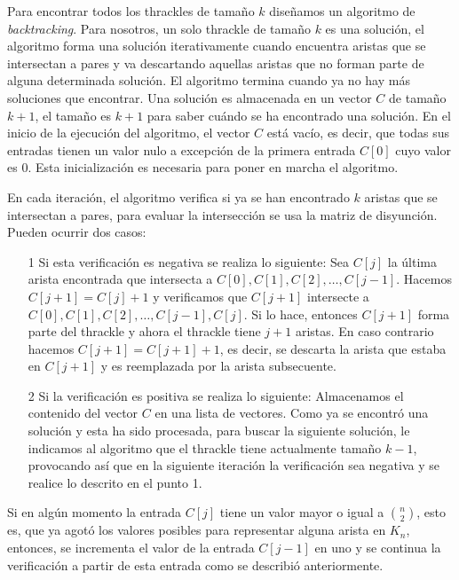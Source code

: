   Para encontrar todos los thrackles de tamaño $k$ diseñamos un algoritmo de
  \emph{backtracking}. Para nosotros, un solo thrackle de tamaño $k$ es una solución, el algoritmo forma una solución iterativamente cuando encuentra aristas que se intersectan a pares y va descartando aquellas aristas que no forman parte de alguna determinada solución. El algoritmo termina cuando ya no hay más soluciones que encontrar. Una solución es almacenada en un vector $C$ de tamaño $k+1$, el tamaño es $k+1$ para saber cuándo se ha encontrado una solución. En el inicio de la ejecución del algoritmo, el vector $C$ está vacío, es decir, que todas sus entradas tienen un valor nulo a excepción de la primera entrada $C[0]$ cuyo valor es 0. Esta inicialización es necesaria para poner en marcha el algoritmo.

  En cada iteración, el algoritmo verifica si ya se han encontrado $k$ aristas que se intersectan a pares, para evaluar la intersección se usa la matriz de disyunción. Pueden ocurrir dos casos:
  \begin{itemize}
    \item[1] Si esta verificación es negativa se realiza lo siguiente:
    Sea $C[j]$ la última arista encontrada que intersecta a $C[0],C[1],C[2],\dots,C[j-1]$. Hacemos $C[j+1]=C[j]+1$ y verificamos que $C[j+1]$ intersecte a $C[0],C[1],C[2],\dots,C[j-1],C[j]$.
    Si lo hace, entonces $C[j+1]$ forma parte del thrackle y ahora el thrackle tiene $j+1$ aristas. En caso contrario hacemos $C[j+1]=C[j+1]+1$, es decir, se descarta la arista que estaba en $C[j+1]$ y es reemplazada por la arista subsecuente.
    \item[2] Si la verificación es positiva se realiza lo siguiente:
    Almacenamos el contenido del vector $C$ en una lista de vectores.
    Como ya se encontró una solución y esta ha sido procesada, para buscar la siguiente solución, le indicamos al algoritmo que el thrackle tiene actualmente tamaño $k-1$, provocando así que en la siguiente iteración la verificación sea negativa y se realice lo descrito en el punto 1.
  \end{itemize}
  Si en algún momento la entrada $C[j]$ tiene un valor mayor o igual a
  $\binom{n}{2}$, esto es, que ya agotó los valores posibles para representar
  alguna arista en $K_n$, entonces, se incrementa el valor de la entrada $C[j-1]$ en uno y se continua la verificación a partir de esta entrada como se describió anteriormente.

